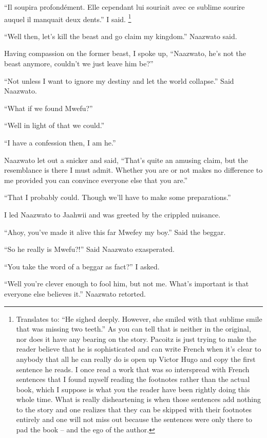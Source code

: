 ``Il soupira profond{\'e}ment. Elle cependant lui souriait avec ce sublime sourire auquel il manquait deux dents.'' I said. \footnote{Translates to: ``He sighed deeply. However, she smiled with that sublime smile that was missing two teeth.'' As you can tell that is neither in the original, nor does it have any bearing on the story. Pacoitz is just trying to make the reader believe that he is sophisticated and can write French when it's clear to anybody that all he can really do is open up Victor Hugo and copy the first sentence he reads. I once read a work that was so interspread with French sentences that I found myself reading the footnotes rather than the actual book, which I suppose is what you the reader have been rightly doing this whole time. What is really disheartening is when those sentences add nothing to the story and one realizes that they can be skipped with their footnotes entirely and one will not miss out because the sentences were only there to pad the book -- and the ego of the author.}

``Well then, let's kill the beast and go claim my kingdom.'' Naazwato said.

Having compassion on the former beast, I spoke up, ``Naazwato, he's not the beast anymore, couldn't we just leave him be?''

``Not unless I want to ignore my destiny and let the world collapse.'' Said Naazwato.

``What if we found Mwefu?''

``Well in light of that we could.''

``I have a confession then, I am he.''

Naazwato let out a snicker and said, ``That's quite an amusing claim, but the resemblance is there I must admit. Whether you are or not makes no difference to me provided you can convince everyone else that you are.''

``That I probably could. Though we'll have to make some preparations.''

I led Naazwato to Jaahwii and was greeted by the crippled nuisance.

``Ahoy, you've made it alive this far Mwefey my boy.'' Said the beggar.

``So he really is Mwefu?!'' Said Naazwato exasperated.

``You take the word of a beggar as fact?'' I asked.

``Well you're clever enough to fool him, but not me. What's important is that everyone else believes it.'' Naazwato retorted.

